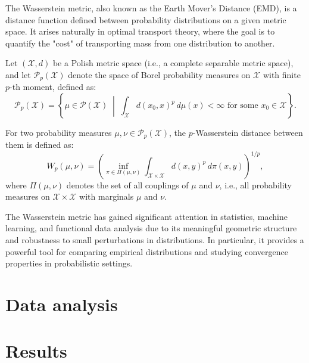 \documentclass[article]{abntex2}
\begin{document}

The Wasserstein metric, also known as the Earth Mover's Distance (EMD), is a distance function defined between probability distributions on a given metric space. It arises naturally in optimal transport theory, where the goal is to quantify the "cost" of transporting mass from one distribution to another.

Let $(\mathcal{X}, d)$ be a Polish metric space (i.e., a complete separable metric space), and let $\mathcal{P}_p(\mathcal{X})$ denote the space of Borel probability measures on $\mathcal{X}$ with finite $p$-th moment, defined as:
\[
\mathcal{P}_p(\mathcal{X}) = \left\{ \mu \in \mathcal{P}(\mathcal{X}) \; \middle| \; \int_{\mathcal{X}} d(x_0, x)^p \, d\mu(x) < \infty \text{ for some } x_0 \in \mathcal{X} \right\}.
\]

For two probability measures $\mu, \nu \in \mathcal{P}_p(\mathcal{X})$, the $p$-Wasserstein distance between them is defined as:
\[
W_p(\mu, \nu) = \left( \inf_{\pi \in \Pi(\mu, \nu)} \int_{\mathcal{X} \times \mathcal{X}} d(x, y)^p \, d\pi(x, y) \right)^{1/p},
\]
where $\Pi(\mu, \nu)$ denotes the set of all couplings of $\mu$ and $\nu$, i.e., all probability measures on $\mathcal{X} \times \mathcal{X}$ with marginals $\mu$ and $\nu$.

The Wasserstein metric has gained significant attention in statistics, machine learning, and functional data analysis due to its meaningful geometric structure and robustness to small perturbations in distributions. In particular, it provides a powerful tool for comparing empirical distributions and studying convergence properties in probabilistic settings.

\section{Data analysis}

\section{Results}
\end{document}
